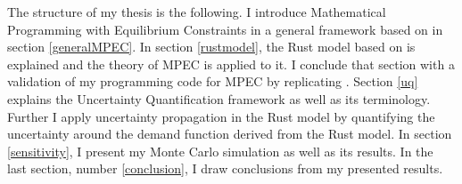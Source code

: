 The structure of my thesis is the following. I introduce Mathematical Programming with Equilibrium Constraints in a general framework based on \cite{Su.Judd.2012} in section \ref{generalMPEC}. In section \ref{rustmodel}, the Rust model based on \cite{Rust.1987} is explained and the theory of MPEC is applied to it. I conclude that section with a validation of my programming code for MPEC by replicating \cite{Iskhakov.2016}. Section \ref{uq} explains the Uncertainty Quantification framework as well as its terminology. Further I apply uncertainty propagation in the Rust model by quantifying the uncertainty around the demand function derived from the Rust model. In section \ref{sensitivity}, I present my Monte Carlo simulation as well as its results. In the last section, number \ref{conclusion}, I draw conclusions from my presented results.

